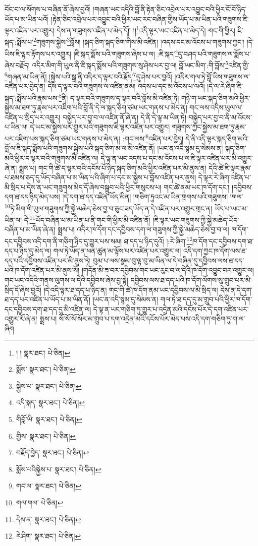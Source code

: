 བོང་བ་ལ་སོགས་པ་བཞིན་ནོ་ཞེས་བྱའོ། །གཞན་ཡང་འདིའི་བློ་ནི་རྟེན་ཅིང་འབྲེལ་པར་འབྱུང་བའི་ཕྱིར་ངོ་བོ་ཉིད་ཡོད་པ་མ་ཡིན་པའོ། །རྟེན་ཅིང་འབྲེལ་པར་འབྱུང་བའི་ཕྱིར་ཡང་རང་བཞིན་གྱིས་ཡོད་པ་མ་ཡིན་པའི་གཟུགས་ཇི་ལྟར་འཛིན་པར་འགྱུར། དེས་ན་གཟུགས་འཛིན་པ་མེད་དོ།། །།\footnote{། །  སྣར་ཐང་།  པེ་ཅིན། }འདི་ལྟར་ཡང་འཛིན་པ་མེད་དེ། གང་གི་ཕྱིར། ཇི་སྐད་:སྨོས་པ་\footnote{སྨོས་  སྣར་ཐང་།  པེ་ཅིན། }གཟུགས་སྐྱེས་\footnote{སྐྱེས་པ་  སྣར་ཐང་།  པེ་ཅིན། }བློས། །སྐད་ཅིག་སྐད་ཅིག་གིས་མི་འཛིན། །འདས་དང་མ་འོངས་པ་གཟུགས་ཀྱང་། །དེ་ཡིས་ཇི་ལྟར་རྟོགས་པར་འགྱུར། །ཇི་སྐད་སྨོས་པའི་གཟུགས་ཞེས་པ་ལ། :ཇི་སྐད་\footnote{འདི་སྐད་  སྣར་ཐང་།  པེ་ཅིན། }དུ་བཤད་པའི་གཟུགས་ལ་སྨོས་པ་ཞེས་བརྗོད། འདིར་མིག་གི་ཡུལ་ནི་ཇི་སྐད་སྨོས་པའི་གཟུགས་སུ་ཤེས་པར་བྱ་ལ། བློ་ཡང་མིག་:གི་བློས་\footnote{གིབློ་ཡི་  སྣར་ཐང་།  པེ་ཅིན། }འཛིན་གྱི་\footnote{གྱིས་  སྣར་ཐང་།  པེ་ཅིན། }གཞན་མ་ཡིན་ནོ། །སྐྱེས་པའི་སྒྲ་ནི་འདིར་ད་ལྟར་བའི་རྗོད་\footnote{བརྗོད་བྱེད་  སྣར་ཐང་།  པེ་ཅིན། }དུ་ཤེས་པར་བྱའོ། །འདིར་གལ་ཏེ་བློ་ཡིས་གཟུགས་ལ་འཛིན་པར་བྱེད་ན། དེས་ད་ལྟར་བའི་གཟུགས་ལ་འཛིན་ནམ། འདས་པ་དང་མ་འོངས་པ་ལའོ། །དེ་ལ་རེ་ཞིག་ཇི་སྐད་:སྨོས་པའི་རྣམ་པས་\footnote{སྨོས་པའིསྐྱེས་པ་  སྣར་ཐང་།  པེ་ཅིན། }ནི། ད་ལྟར་བའི་གཟུགས་ད་ལྟར་བའི་བློས་མི་འཛིན་ཏེ། གཉི་ག་ཡང་སྐད་ཅིག་མའི་ཕྱིར་སྐྱེས་མ་ཐག་ཏུ་རྣམ་པར་འཇིག་པའི་བློ་ནི་དེ་ལ་སྐད་ཅིག་ཙམ་ཡང་གནས་པ་མེད་ན། གང་ལས་འདིས་ཡུལ་ལ་འཛིན་པ་སྲིད་པར་འགྱུར། བསྐྱེད་པར་བྱ་བ་ལ་འཛིན་ནོ་ཞེ་ན། དེ་ནི་དེ་ལྟ་མ་ཡིན་ཏེ། བསྐྱེད་པར་བྱ་བ་ནི་མ་འོངས་པ་ཡིན་ལ། དེ་ཡང་མ་སྐྱེས་པར་གྱུར་པའི་གཟུགས་ཇི་ལྟར་འཛིན་པར་འགྱུར། གཟུགས་ཀྱང་སྐྱེས་མ་ཐག་ཏུ་རྣམ་པར་འཇིག་པས་སྐད་ཅིག་ཙམ་ཡང་གནས་པ་མེད་ན། :གང་ལས་\footnote{གང་ལ་  སྣར་ཐང་།  པེ་ཅིན། }འཛིན་པར་བྱེད། དེ་ནི་འདི་ལྟར་སྐད་ཅིག་མའི་བློ་ལ་ཇི་སྐད་སྨོས་པའི་གཟུགས་སྐྱེས་པའི་སྐད་ཅིག་མ་ལ་མི་འཛིན་ནོ། །ཡང་ན་འདི་སྙམ་དུ་སེམས་ན། སྐད་ཅིག་མའི་ཕྱིར་ད་ལྟར་བའི་གཟུགས་མི་འཛིན་ལ། དེ་ལྟ་ན་ཡང་འདས་པ་དང་མ་འོངས་པ་ལ་ཇི་ལྟར་འཛིན་པར་མི་འགྱུར་ཞེ་ན། སྨྲས་པ། གང་གི་ཚེ་ད་ལྟར་བའི་དངོས་པོ་ཉིད་སྐད་ཅིག་མའི་ཕྱིར་འཛིན་པར་མི་ནུས་ན། དེའི་ཚེ་ཇི་ལྟར་རྣམ་པ་ཐམས་ཅད་དུ་ཡོད་བཞིན་པ་མ་ཡིན་པའི་ཞིག་པ་དང་མ་སྐྱེས་པ་བློས་འཛིན་པར་ནུས། དེ་ལྟར་རེ་ཞིག་འཛིན་པ་མི་སྲིད་པ་དེས་ན་ཡང་གཟུགས་མེད་དོ་ཞེས་བསྒྲུབ་པའི་ཕྱིར་གསུངས་པ། གང་ཚེ་ནམ་ཡང་ཁ་དོག་དང་། །དབྱིབས་དག་ཐ་དད་ཉིད་མེད་པས། །དེ་དག་ཐ་དད་འཛིན་ཡོད་མིན། །གཅིག་ཏུའང་མ་ཡིན་གྲགས་པའི་གཟུགས། །གལ་\footnote{གལ་གལ་  པེ་ཅིན། }ཏེ་མིག་གི་ཡུལ་གཟུགས་ཀྱི་སྐྱེ་མཆེད་ཅེས་བྱ་བ་ཅུང་ཟད་ཡོད་ན་དེ་འཛིན་པར་འགྱུར་གྲང་ན། ཡོད་པ་ཡང་མ་ཡིན་ལ། དེ་\footnote{དེས་ན་  སྣར་ཐང་།  པེ་ཅིན། }ཡོད་བཞིན་པ་མ་ཡིན་པ་ནི་གང་གི་ཕྱིར་མི་འཛིན་ནོ། །ཇི་ལྟར་ཡང་གཟུགས་ཀྱི་སྐྱེ་མཆེད་ཡོད་བཞིན་པ་མ་ཡིན་ཞེ་ན། སྨྲས་པ། འདིར་ཁ་དོག་དང་དབྱིབས་དག་ལ་གཟུགས་ཀྱི་སྐྱེ་མཆེད་ཅེས་བྱ་བ་ལ། ཁ་དོག་དང་དབྱིབས་འདི་དག་ནི་གཅིག་ཉིད་དུ་གྱུར་པས་སམ། ཐ་དད་པ་ཉིད་དུའོ། །:རེ་ཞིག་\footnote{རེ་ཤིག་  སྣར་ཐང་།  པེ་ཅིན། }ཁ་དོག་དང་དབྱིབས་དག་ཐ་དད་པ་ཉིད་དུ་མེད་ལ། གལ་ཏེ་ཡོད་ན་ཕན་ཚུན་མ་ལྟོས་པར་འཛིན་པར་འགྱུར་ལ། འདི་དག་ཀྱང་ཁ་དོག་ལས་ཐ་དད་པའི་དབྱིབས་འཛིན་པར་མི་ནུས་ཏེ། བུམ་པ་ལས་སྣམ་བུ་ལྟ་བུ་མ་ཡིན་ལ་དེ་བཞིན་དུ་དབྱིབས་ལས་ཐ་དད་པའི་ཁ་དོག་འཛིན་པར་མི་ནུས་སོ། །གདོན་མི་ཟ་བར་དབྱིབས་གང་ཡང་རུང་བ་ལ་དེའི་ཁ་དོག་འབྱུང་བར་འགྱུར་ལ། གང་ཡང་འདིའི་གནས་ལུགས་ལ་དེའི་དབྱིབས་ཞེས་བྱ་སྟེ། དབྱིབས་ལས་ཐ་དད་པའི་ཁ་དོག་ལོགས་སུ་གྲུབ་པར་མི་སྲིད་དོ་ཞེས་བྱའོ། །དེ་འདི་ལྟར་ཐ་དད་པ་ཉིད་ན། གང་གི་ཚེ་ཁ་དོག་ནམ་ཡང་དབྱིབས་ལ་མི་སྲིད་ལ། དེས་ན་དེ་དག་ཐ་དད་པར་འཛིན་པ་ཡོད་པ་མ་ཡིན་ནོ། །ཡང་ན་འདི་སྙམ་དུ་སེམས་ན། གལ་ཏེ་ཐ་དད་དུ་མ་གྲུབ་པའི་ཕྱིར་ཁ་དོག་དང་དབྱིབས་དག་ཐ་དད་དུ་མི་འཛིན་ལ། དེ་ལྟ་ན་ཡང་གཅིག་ཏུ་གྱུར་པ་འདྲེན་མའི་དངོས་པོར་དེ་དག་འཛིན་པར་འགྱུར་རོ་ཞེ་ན། སྨྲས་པ། སོ་སོ་སོ་སོར་མ་གྲུབ་པ་དག་འདྲེན་མའི་དངོས་པོར་མེད་པས་འདི་དག་གཅིག་ཏུ་ག་ལ་ཞིག 